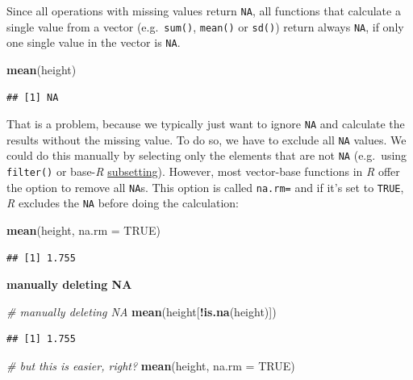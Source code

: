 \documentclass[
]{scrartcl}
\newenvironment{Shaded}{\begin{snugshade}}{\end{snugshade}}
\newcommand{\AttributeTok}[1]{\textcolor[rgb]{0.13,0.29,0.53}{#1}}
\newcommand{\CommentTok}[1]{\textcolor[rgb]{0.56,0.35,0.01}{\textit{#1}}}
\newcommand{\ConstantTok}[1]{\textcolor[rgb]{0.56,0.35,0.01}{#1}}
\newcommand{\FunctionTok}[1]{\textcolor[rgb]{0.13,0.29,0.53}{\textbf{#1}}}
\newcommand{\NormalTok}[1]{#1}
\newcommand{\SpecialCharTok}[1]{\textcolor[rgb]{0.81,0.36,0.00}{\textbf{#1}}}
\newenvironment{webexsolution}[1]
    {\par\tiny\textbf{#1}}
    {\par}
\newcommand{\webexhide}[1]{\begin{webexsolution}{#1}}
\begin{document}
Since all operations with missing values return \texttt{NA}, all functions that calculate a single value from a vector (e.g.~\texttt{sum()}, \texttt{mean()} or \texttt{sd()}) return always \texttt{NA}, if only one single value in the vector is \texttt{NA}.

\begin{Shaded}
\begin{Highlighting}[]
\FunctionTok{mean}\NormalTok{(height)}
\end{Highlighting}
\end{Shaded}

\begin{verbatim}
## [1] NA
\end{verbatim}

That is a problem, because we typically just want to ignore \texttt{NA} and calculate the results without the missing value. To do so, we have to exclude all \texttt{NA} values. We could do this manually by selecting only the elements that are not \texttt{NA} (e.g.~using \texttt{filter()} or base-\emph{R} \url{subsetting}). However, most vector-base functions in \emph{R} offer the option to remove all \texttt{NA}s. This option is called \texttt{na.rm=} and if it's set to \texttt{TRUE}, \emph{R} excludes the \texttt{NA} before doing the calculation:

\begin{Shaded}
\begin{Highlighting}[]
\FunctionTok{mean}\NormalTok{(height, }\AttributeTok{na.rm =} \ConstantTok{TRUE}\NormalTok{)}
\end{Highlighting}
\end{Shaded}

\begin{verbatim}
## [1] 1.755
\end{verbatim}

\webexhide{manually deleting NA}

\begin{Shaded}
\begin{Highlighting}[]
\CommentTok{\# manually deleting  NA}
\FunctionTok{mean}\NormalTok{(height[}\SpecialCharTok{!}\FunctionTok{is.na}\NormalTok{(height)])}
\end{Highlighting}
\end{Shaded}

\begin{verbatim}
## [1] 1.755
\end{verbatim}

\begin{Shaded}
\begin{Highlighting}[]
\CommentTok{\# but this is easier, right?}
\FunctionTok{mean}\NormalTok{(height, }\AttributeTok{na.rm =} \ConstantTok{TRUE}\NormalTok{)}
\end{Highlighting}
\end{Shaded}
\end{document}

